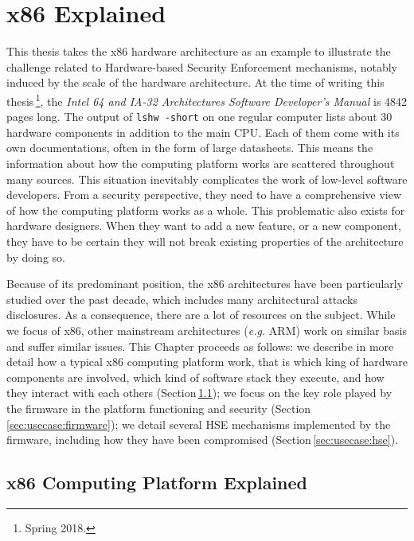 \chapter{x86 Explained}
\label{chapter:usecase}

This thesis takes the x86 hardware architecture as an example to illustrate the
challenge related to Hardware-based Security Enforcement mechanisms, notably
induced by the scale of the hardware architecture.
%
At the time of writing this thesis\,\footnote{Spring 2018.}, the \emph{Intel 64
  and IA-32 Architectures Software Developer’s Manual} is 4842 pages long.
%
The output of \texttt{lshw -short} on one regular computer lists about 30
hardware components in addition to the main CPU.
%
Each of them come with its own documentations, often in the form of large
datasheets.
%
This means the information about how the computing platform works are scattered
throughout many sources.
%
This situation inevitably complicates the work of low-level software developers.
%
From a security perspective, they need to have a comprehensive view of how the
computing platform works as a whole.
%
This problematic also exists for hardware designers.
%
When they want to add a new feature, or a new component, they have to be certain
they will not break existing properties of the architecture by doing so.

Because of its predominant position, the x86 architectures have been
particularly studied over the past decade, which includes many architectural
attacks disclosures.
%
As a consequence, there are a lot of resources on the subject.
%
While we focus of x86, other mainstream architectures (\emph{e.g.} ARM) work on
similar basis and suffer similar issues.
%
This Chapter proceeds as follows:
%
we describe in more detail how a typical x86 computing platform work, that is
which king of hardware components are involved, which kind of software stack
they execute, and how they interact with each others
(Section\,\ref{sec:usecase:architecture});
%
we focus on the key role played by the firmware in the platform functioning and
security (Section\,\ref{sec:usecase:firmware});
%
we detail several HSE mechanisms implemented by the firmware, including how they
have been compromised (Section\,\ref{sec:usecase:hse}).

\section{x86 Computing Platform Explained}
\label{sec:usecase:architecture}

